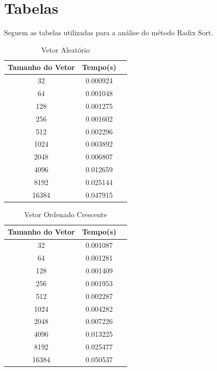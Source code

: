 \documentclass[12pt,a4paper,twoside]{report}
\begin{document}
\chapter{Tabelas}

Seguem as tabelas utilizadas para a análise do método Radix Sort.

\begin{table}[h]
  \centering
  \caption{Vetor Aleatório \label{tab:aleatorio}}
  \begin{tabular}{ccc} \\\hline
  \textbf{Tamanho do Vetor}  & \textbf{Tempo(s)} \\\hline
  32                                   & 0.000924          \\\hline
  64                                   & 0.001048          \\\hline
  128                                  & 0.001275          \\\hline
  256                                  & 0.001602          \\\hline
  512                                  & 0.002296          \\\hline
  1024                                 & 0.003892          \\\hline
  2048                                 & 0.006807          \\\hline
  4096                                 & 0.012659         \\\hline
  8192                                 & 0.025144         \\\hline
  16384                                & 0.047915        \\\hline
  \end{tabular}
\end{table}


\begin{table}[h]
  \centering
  \caption{Vetor Ordenado Crescente \label{tab:oc}}
  \begin{tabular}{ccc} \\\hline
  \textbf{Tamanho do Vetor}  & \textbf{Tempo(s)} \\\hline
  32                              & 0.001087          \\\hline
  64                              & 0.001281          \\\hline
  128                             & 0.001409          \\\hline
  256                             & 0.001953          \\\hline
  512                             & 0.002287          \\\hline
  1024                            & 0.004282          \\\hline
  2048                            & 0.007226          \\\hline
  4096                            & 0.013225         \\\hline
  8192                            & 0.025477         \\\hline
  16384                           & 0.050537
  \\\hline
  \end{tabular}
\end{table}
\end{document}
